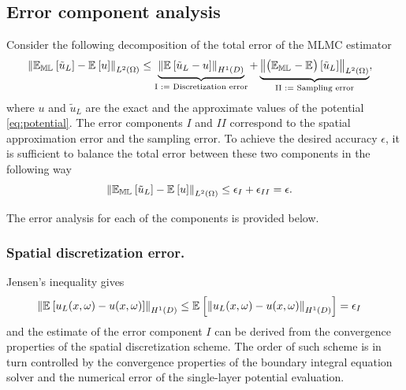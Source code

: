 \subsection{Error component analysis}
Consider the following decomposition of the total error of the MLMC estimator
\begin{align} \label{eq:error_decomp}
	&\left\|  \mathbb{E_{ML}}_{{}} \left[ {\tilde{u}_L} \right] - \mathbb{E}_{{}} \left[ { u } \right]  \right\|_{L^2(\Omega)}
	\leq \underbrace{ \left\|  \mathbb{E}_{{}} \left[ { \tilde{u}_L - u } \right]      \right\|_{H^1(D)}  }_{\text{I := Discretization error}}
	+     \underbrace{ \left\|  \big( \mathbb{E_{ML}}_{{}} - \mathbb{E}_{{}} \big) \left[ { \tilde{u}_L} \right]  \right\|_{L^2(\Omega)} }_{\text{II := Sampling error}}
	, 
\end{align}
where $u$ and $\tilde{u}_L$ are the exact and the approximate values of the potential \eqref{eq:potential}. 
The error components $I$ and $II$ correspond to the spatial approximation error and the sampling error.
To achieve the desired accuracy $\epsilon$, it is sufficient to balance the total error between these two components in the following way
\begin{align} \label{eq:MLMC_tol}
	\norm{ \EML{\tilde{u}_L} - \E{ u } }{L^2(\Omega)}
	&\leq \epsilon_I + \epsilon_{II} %
	= \epsilon
	.
\end{align}

The error analysis for each of the components is provided below.




\subsubsection{Spatial discretization error.}

Jensen's inequality gives
\begin{align}\label{eq:eps_I}
	\left\|  \mathbb{E}_{{}} \left[ { u_L({x},\omega) - u ({x},\omega)} \right]  \right\|_{H^1(D)}
	&\leq
	\mathbb{E}_{{}} \left[ { \left\|  u_L({x},\omega) - u ({x},\omega)  \right\|_{H^1(D)} } \right]
	= \epsilon_{I}
\end{align}
and the estimate of the error component $I$ can be derived from the convergence properties of the spatial discretization scheme.
The order of such scheme is in turn controlled by the convergence properties of the boundary integral equation solver and the numerical error of the single-layer potential evaluation.

